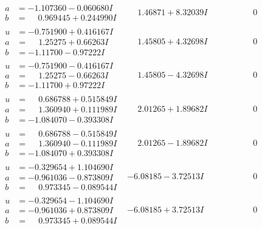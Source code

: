 \documentclass[1p]{elsarticle_modified}
\theoremstyle{definition}
\begin{document}
$$\begin{array}{c|c|c}
\begin{aligned}
a &= -1.107360 - 0.060680 I \\
b &= \phantom{-}0.969445 + 0.244990 I\end{aligned}
 & \phantom{-}1.46871 + 8.32039 I & \phantom{-0.000000 } 0 \\ \hline\begin{aligned}
u &= -0.751900 + 0.416167 I \\
a &= \phantom{-}1.25275 + 0.66263 I \\
b &= -1.11700 - 0.97222 I\end{aligned}
 & \phantom{-}1.45805 + 4.32698 I & \phantom{-0.000000 } 0 \\ \hline\begin{aligned}
u &= -0.751900 - 0.416167 I \\
a &= \phantom{-}1.25275 - 0.66263 I \\
b &= -1.11700 + 0.97222 I\end{aligned}
 & \phantom{-}1.45805 - 4.32698 I & \phantom{-0.000000 } 0 \\ \hline\begin{aligned}
u &= \phantom{-}0.686788 + 0.515849 I \\
a &= \phantom{-}1.360940 + 0.111989 I \\
b &= -1.084070 - 0.393308 I\end{aligned}
 & \phantom{-}2.01265 + 1.89682 I & \phantom{-0.000000 } 0 \\ \hline\begin{aligned}
u &= \phantom{-}0.686788 - 0.515849 I \\
a &= \phantom{-}1.360940 - 0.111989 I \\
b &= -1.084070 + 0.393308 I\end{aligned}
 & \phantom{-}2.01265 - 1.89682 I & \phantom{-0.000000 } 0 \\ \hline\begin{aligned}
u &= -0.329654 + 1.104690 I \\
a &= -0.961036 - 0.873809 I \\
b &= \phantom{-}0.973345 - 0.089544 I\end{aligned}
 & -6.08185 - 3.72513 I & \phantom{-0.000000 } 0 \\ \hline\begin{aligned}
u &= -0.329654 - 1.104690 I \\
a &= -0.961036 + 0.873809 I \\
b &= \phantom{-}0.973345 + 0.089544 I\end{aligned}
 & -6.08185 + 3.72513 I & \phantom{-0.000000 } 0 \\ \hline\begin{aligned}

\end{aligned}
\end{array}$$
\end{document}
